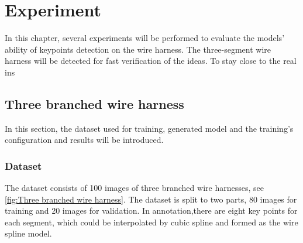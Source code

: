 \chapter{Experiment}
	In this chapter, several experiments will be performed to evaluate the models' ability of keypoints detection on the wire harness. The three-segment
	wire harness will be detected for fast verification of the ideas. To stay close to the real ins
\section{Three branched wire harness}
	In this section, the dataset used for training, generated model and the training's configuration and results will be introduced.
\subsection{Dataset}
	The dataset consists of 100 images of three branched wire harnesses, see \autoref{fig:Three branched wire harness}. The dataset is split to 
	two parts, 80 images for training and 20 images for validation.
	In annotation,there are eight key points for each segment, which could be interpolated by cubic spline and formed as the wire spline model.
